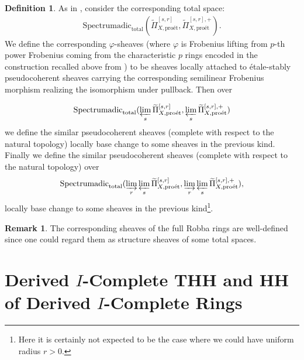 \documentclass[11pt]{book}
\theoremstyle{definition}
\newtheorem{definition}[theorem]{Definition}
\newtheorem{remark}[theorem]{Remark}
\numberwithin{equation}{section}
\begin{document}
\begin{definition}
As in \cite[Chapter 4.3 and Chapter 8]{12KL2}, consider the corresponding total space:
\begin{align}
\mathrm{Spectrumadic}_{\mathrm{total}}(\widetilde{\Pi}^{[s,r]}_{X,\text{pro\'et}},\widetilde{\Pi}^{[s,r],+}_{X,\text{pro\'et}}).	
\end{align}
We define the corresponding $\varphi$-sheaves (where $\varphi$ is Frobenius lifting from $p$-th power Frobenius coming from the characteristic $p$ rings encoded in the construction recalled above from \cite{12KL2}) to be sheaves locally attached to \'etale-stably pseudocoherent sheaves carrying the corresponding semilinear Frobenius morphism realizing the isomorphism under pullback. Then over 

\begin{align}
\mathrm{Spectrumadic}_{\mathrm{total}}(\varprojlim_s \widetilde{\Pi}^{[s,r]}_{X,\text{pro\'et}},\varprojlim_s \widetilde{\Pi}^{[s,r],+}_{X,\text{pro\'et}})	
\end{align}
we define the similar pseudocoherent sheaves (complete with respect to the natural topology) locally base change to some sheaves in the previous kind. Finally we define the similar pseudocoherent sheaves (complete with respect to the natural topology) over 
\begin{align}
\mathrm{Spectrumadic}_{\mathrm{total}}(\varinjlim_r \varprojlim_s \widetilde{\Pi}^{[s,r]}_{X,\text{pro\'et}},\varinjlim_r \varprojlim_s \widetilde{\Pi}^{[s,r],+}_{X,\text{pro\'et}}),
\end{align}
locally base change to some sheaves in the previous kind\footnote{Here it is certainly not expected to be the case where we could have uniform radius $r>0$.}.

\end{definition}



\begin{remark}
The corresponding sheaves of the full Robba rings are well-defined since one could regard them as structure sheaves of some total spaces.	
\end{remark}




\newpage


\section{Derived $I$-Complete THH and HH of Derived $I$-Complete Rings}
\end{document}
